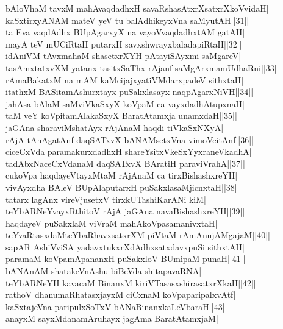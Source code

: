 \documentclass{article}
\begin{document}
bAloVhaM tavxM mahAvaqdadhxH savaRshasAtxrXsatxrXkoVvidaH|\\
kaSxtirxyANAM mateV yeV tu balAdhikeyxVna saMyutAH||31||\\
ta Eva vaqdAdhx BUpAgarxyX na vayoVvaqdadhxtAM gatAH|\\
mayA teV mUCiRtaH putarxH savxshwrayxbaladapiRtaH||32||\\
idAniVM  tAvxmahaM shasetxrXYH pAtayiSAyxmi saMgareV|\\
tasAmxtatxvXM yatanx tasitxSaThx rAjanf saMgArxmamUdhaRni||33||\\
rAmaBakatxM na mAM kaMcijajxyatiVMdarxpadeV sithxtaH|\\
itathxM BASitamAshurxtayx puSakxlasayx naqpAgarxNiVH||34||\\
ja{hA}sa bAlaM saMviVkaSxyX koVpaM ca vayxdadhAtupxnaH|\\
taM veY koVpitamAlakaSxyX BaratAtamxja unamxdaH||35||\\
jaGAna sharaviMshatAyx rAjAnaM haqdi tiVkaSxNXyA|\\
rAjA tAnAgatAnf daqSATxvX bANAMsetxVna vimoVcitAnf||36||\\
ciceCxVda paramakurxdadhxH shareYsitxVkeSxYyxraneVkadhA|\\
tadAbxNaceCxVdanaM daqSATxvX BAratiH paraviVrahA||37||\\
cukoVpa haqdayeVtayxMtaM rAjAnaM ca tirxBishashxreYH|\\
vivAyxdha BAleV BUpAlaputarxH puSakxlasaMjicnxtaH||38||\\
tatarx lagAnx vireVjusetxV tirxkUTashiKarANi kiM|\\
teYbARNeYvayxRthitoV rAjA jaGAna navaBishashxreYH||39||\\
haqdayeV puSakxlaM viVraM mahAkoVpasamanivxtaH|\\
teYvaRtasxdaMteYbaRhavxsatxrXM piVtaM rAmAnujAMgajaM||40||\\
sapAR AshiVviSA yadavxtukxrXdAdhxsatxdavxpuSi sithxtAH|\\
paramaM koVpamApananxH puSakxloV BUmipaM punaH||41||\\
bANAnAM shatakeVnAshu biBeVda shitapavaRNA|\\
teYbARNeYH kavacaM BinanxM kiriVTasasxshirasatxrXkaH||42||\\
rathoV dhanumaRhatasxjayxM ciCxnaM koVpaparipalxvAtf|\\
kaSxtajeVna paripulxSoTxV bANaBinanxkaLeVbaraH||43||\\
anayxM sayxMdanamAruhayx jagAma BaratAtamxjaM|\\
\end{document}
